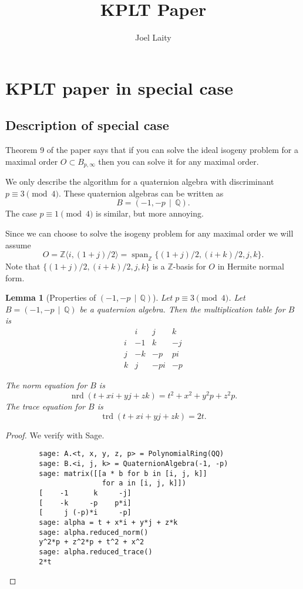 \documentclass[10pt]{article}
\title{KPLT Paper}
\author{Joel Laity}
\theoremstyle{plain}
\newtheorem{lemma}[theorem]{Lemma}
\theoremstyle{definition}
\newcommand{\op}{\operatorname}
\newcommand{\Z}{\mathbb{Z}}
\newcommand{\Q}{\mathbb{Q}}
\newcommand{\nrd}{\op{nrd}}
\newcommand{\trd}{\op{trd}}
\begin{document}
\maketitle
\tableofcontents


\section{KPLT paper in special case}
\subsection{Description of special case}

Theorem 9 of the paper says that if you can solve the ideal isogeny problem for a maximal order \( O \subset B_{p, \infty} \) then you can solve it for any  maximal order.


We only describe the algorithm for a quaternion algebra with discriminant \( p \equiv 3 \pmod{4} \).
These quaternion algebras can be written as
\[
    B = (-1, -p \, \mid \, \Q).
\]
The case \( p \equiv 1 \pmod{4} \) is similar, but more annoying.

Since we can choose to solve the isogeny problem for any maximal order we will assume
\[
    O = \Z \langle i, (1+j) / 2 \rangle = \op{span}_\Z \{ (1+j) / 2, (i+k) / 2 , j, k \}.
\]
Note that \( \{ (1+j) / 2, (i+k) / 2 , j, k \} \) is a \( \Z \)-basis for \( O \) in Hermite normal form.

\begin{lemma}[Properties of \( (-1, -p \, \mid \, \Q) \)]
    Let \( p \equiv 3 \pmod{4} \).
    Let \( B =  (-1, -p \, \mid \, \Q) \) be a quaternion algebra.
    Then the multiplication table for \( B \) is
    \[
        \begin{array}{c|ccc}
              & i  & j   & k  \\
            \hline
            i & -1 & k   & -j \\
            j & -k & -p  & pi \\
            k & j  & -pi & -p
        \end{array}
    \]

    The norm equation for \( B \) is
    \[
        \nrd(t + xi + yj + zk) = t^2 + x^2 + y^2p + z^2p.
    \]
    The trace equation for \( B \) is
    \[
        \trd(t + xi + yj + zk) = 2t.
    \]
\end{lemma}
\begin{proof}
    We verify with Sage.
    \begin{lstlisting}
        sage: A.<t, x, y, z, p> = PolynomialRing(QQ)
        sage: B.<i, j, k> = QuaternionAlgebra(-1, -p)
        sage: matrix([[a * b for b in [i, j, k]]
                       for a in [i, j, k]])
        [    -1      k     -j]
        [    -k     -p    p*i]
        [     j (-p)*i     -p]
        sage: alpha = t + x*i + y*j + z*k
        sage: alpha.reduced_norm()
        y^2*p + z^2*p + t^2 + x^2
        sage: alpha.reduced_trace()
        2*t
    \end{lstlisting}
\end{proof}
\end{document}

